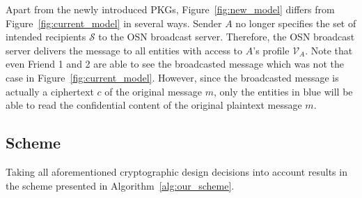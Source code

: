 Apart from the newly introduced PKGs, Figure~\ref{fig:new_model} differs from Figure~\ref{fig:current_model} in several ways. Sender $A$ no longer specifies the set of intended recipients $\mathcal{S}$ to the OSN broadcast server. Therefore, the OSN broadcast server delivers the message to all entities with access to $A$'s profile $\mathcal{V}_A$. Note that even Friend 1 and 2 are able to see the broadcasted message which was not the case in Figure~\ref{fig:current_model}. However, since the broadcasted message is actually a ciphertext $c$ of the original message $m$, only the entities in blue will be able to read the confidential content of the original plaintext message $m$.








\subsection{Scheme}
\label{sec:proposed_scheme}
Taking all aforementioned cryptographic design decisions into account results in the scheme presented in Algorithm~\ref{alg:our_scheme}.

